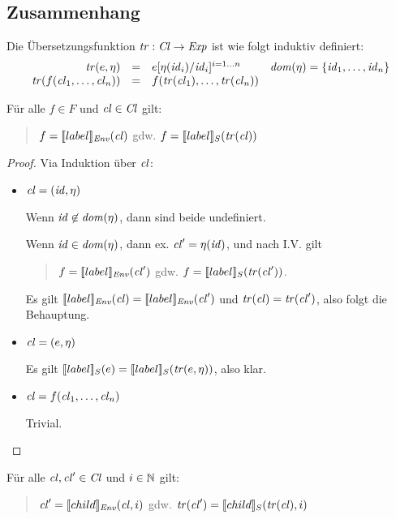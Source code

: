\documentclass[12pt,a4paper,draft]{article}
\begin{document}
\subsection*{Zusammenhang}

Die \"Ubersetzungsfunktion $\mathit{tr}:\mathit{Cl}\to\mathit{Exp}$ ist wie folgt induktiv definiert:
\[\begin{array}{rcll}
  \mathit{tr}(e,\eta)
  &=& e[\eta(\mathit{id}_i)/\mathit{id}_i]^{i=1 \ldots n}
  & \mathit{dom}(\eta) = \{\mathit{id}_1,\ldots,\mathit{id}_n\}
  \\
  \mathit{tr}(f(\mathit{cl}_1,\ldots,\mathit{cl}_n))
  &=& f(\mathit{tr}(\mathit{cl}_1),\ldots,\mathit{tr}(\mathit{cl}_n))
\end{array}\]

\begin{lemma}
  F\"ur alle $f \in F$ und $\mathit{cl} \in \mathit{Cl}$ gilt:
  \begin{quote}
  $f = [\![label]\!]_{\mathit{Env}}(\mathit{cl})$ gdw. $f = [\![label]\!]_S(\mathit{tr}(\mathit{cl}))$
  \end{quote}
\end{lemma}

\begin{proof}
  Via Induktion \"uber $\mathit{cl}$:
  \begin{itemize}
  \item $\mathit{cl} = (\mathit{id},\eta)$

    Wenn $\mathit{id} \not\in \mathit{dom}(\eta)$, dann sind beide undefiniert.

    Wenn $\mathit{id} \in \mathit{dom}(\eta)$, dann ex. $\mathit{cl}' = \eta(\mathit{id})$, und nach I.V. gilt
    \begin{quote}
      $f = [\![label]\!]_{\mathit{Env}}(\mathit{cl}')$ gdw. $f = [\![label]\!]_S(\mathit{tr}(\mathit{cl}'))$.
    \end{quote}
    Es gilt $[\![label]\!]_{\mathit{Env}}(\mathit{cl}) = [\![label]\!]_{\mathit{Env}}(\mathit{cl}')$ und
    $\mathit{tr}(\mathit{cl}) = \mathit{tr}(\mathit{cl}')$, also folgt die Behauptung.

  \item $\mathit{cl} = (e,\eta)$

    Es gilt $[\![label]\!]_S(e) = [\![label]\!]_S(\mathit{tr}(e,\eta))$, also klar.

  \item $\mathit{cl} = f(\mathit{cl}_1,\ldots,\mathit{cl}_n)$

    Trivial.

  \end{itemize}
\end{proof}

\begin{lemma}
  F\"ur alle $\mathit{cl},\mathit{cl}' \in \mathit{Cl}$ und $i \in \mathbb N$ gilt:
  \begin{quote}
    $\mathit{cl}' = [\![child]\!]_{\mathit{Env}}(\mathit{cl},i)$ gdw. $\mathit{tr}(\mathit{cl}') = [\![child]\!]_S(\mathit{tr}(\mathit{cl}),i)$
  \end{quote}
\end{lemma}
\end{document}
